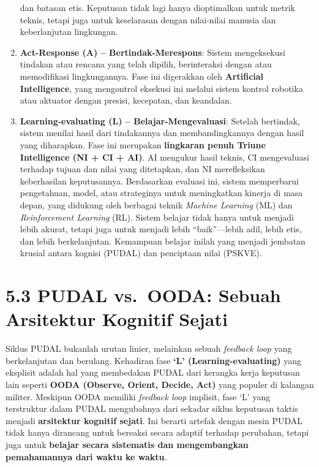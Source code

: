 \documentclass[
  letterpaper,
  DIV=11,
  numbers=noendperiod]{scrreprt}
\begin{document}
\begin{enumerate}
  dan batasan etis. Keputusan tidak lagi hanya dioptimalkan untuk metrik
  teknis, tetapi juga untuk keselarasan dengan nilai-nilai manusia dan
  keberlanjutan lingkungan.
\item
  \textbf{Act-Response (A) -- Bertindak-Merespons}: Sistem mengeksekusi
  tindakan atau rencana yang telah dipilih, berinteraksi dengan atau
  memodifikasi lingkungannya. Fase ini digerakkan oleh
  \textbf{Artificial Intelligence}, yang mengontrol eksekusi ini melalui
  sistem kontrol robotika atau aktuator dengan presisi, kecepatan, dan
  keandalan.
\item
  \textbf{Learning-evaluating (L) -- Belajar-Mengevaluasi}: Setelah
  bertindak, sistem menilai hasil dari tindakannya dan membandingkannya
  dengan hasil yang diharapkan. Fase ini merupakan \textbf{lingkaran
  penuh Triune Intelligence (NI + CI + AI)}. AI mengukur hasil teknis,
  CI mengevaluasi terhadap tujuan dan nilai yang ditetapkan, dan NI
  merefleksikan keberhasilan keputusannya. Berdasarkan evaluasi ini,
  sistem memperbarui pengetahuan, model, atau strateginya untuk
  meningkatkan kinerja di masa depan, yang didukung oleh berbagai teknik
  \emph{Machine Learning} (ML) dan \emph{Reinforcement Learning} (RL).
  Sistem belajar tidak hanya untuk menjadi lebih akurat, tetapi juga
  untuk menjadi lebih ``baik''---lebih adil, lebih etis, dan lebih
  berkelanjutan. Kemampuan belajar inilah yang menjadi jembatan krusial
  antara kognisi (PUDAL) dan penciptaan nilai (PSKVE).
\end{enumerate}

\section{\texorpdfstring{\textbf{5.3 PUDAL vs.~OODA: Sebuah Arsitektur
Kognitif
Sejati}}{5.3 PUDAL vs.~OODA: Sebuah Arsitektur Kognitif Sejati}}\label{pudal-vs.-ooda-sebuah-arsitektur-kognitif-sejati}

Siklus PUDAL bukanlah urutan linier, melainkan sebuah \emph{feedback
loop} yang berkelanjutan dan berulang. Kehadiran fase \textbf{`L'
(Learning-evaluating)} yang eksplisit adalah hal yang membedakan PUDAL
dari kerangka kerja keputusan lain seperti \textbf{OODA (Observe,
Orient, Decide, Act)} yang populer di kalangan militer. Meskipun OODA
memiliki \emph{feedback loop} implisit, fase `L' yang terstruktur dalam
PUDAL mengubahnya dari sekadar siklus keputusan taktis menjadi
\textbf{arsitektur kognitif sejati}. Ini berarti artefak dengan mesin
PUDAL tidak hanya dirancang untuk bereaksi secara adaptif terhadap
perubahan, tetapi juga untuk \textbf{belajar secara sistematis dan
mengembangkan pemahamannya dari waktu ke waktu}.
\end{document}
